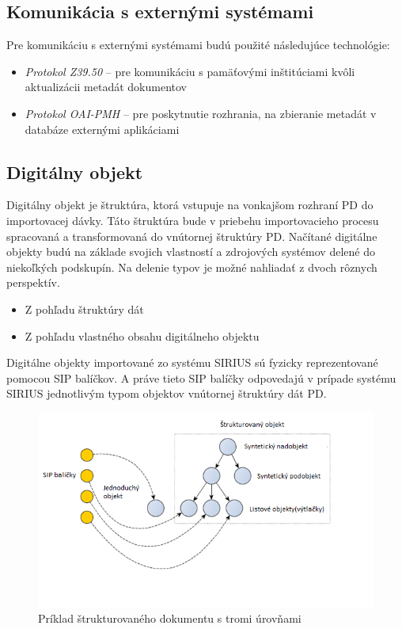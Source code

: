 \documentclass[
  print, %
  table,   %
  lof,     %
  nolot,     %
]{fithesis3}
\begin{document}
\subsection{Komunikácia s externými systémami}
Pre komunikáciu s externými systémami budú použité následujúce technológie:
\begin{itemize} 
\item \textit{Protokol Z39.50} – pre komunikáciu s pamäťovými inštitúciami kvôli aktualizácii metadát dokumentov
\item \textit{Protokol OAI-PMH} – pre poskytnutie rozhrania, na zbieranie metadát v databáze externými aplikáciami
\end{itemize}
\subsection{Digitálny objekt}
Digitálny objekt je štruktúra, ktorá vstupuje na vonkajšom rozhraní PD do importovacej dávky. Táto štruktúra bude v priebehu importovacieho procesu spracovaná a transformovaná do vnútornej štruktúry PD.
Načítané digitálne objekty budú na základe svojich vlastností a zdrojových systémov delené do niekoľkých podskupín. Na delenie typov je možné nahliadať z dvoch rôznych perspektív.
\begin{itemize}
\item	Z pohľadu štruktúry dát 
\item	Z pohľadu vlastného obsahu digitálneho objektu
\end{itemize}
Digitálne objekty importované zo systému SIRIUS sú fyzicky reprezentované pomocou SIP balíčkov. A práve tieto SIP balíčky odpovedajú v prípade systému SIRIUS jednotlivým typom objektov vnútornej štruktúry dát PD.
\begin{figure}[H]
	\centering
		\includegraphics[width=\textwidth]{fithesis/obr/struktObj.png}
	
	\caption{Príklad štrukturovaného dokumentu s tromi úrovňami}
	\label{structDg3l}
\end{figure}
\end{document}
